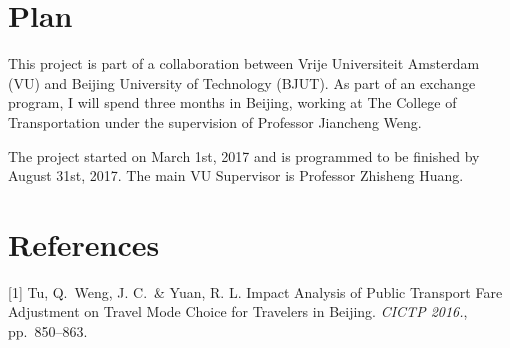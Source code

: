 \documentclass{article}
\begin{document}
\section{Plan}
This project is part of a collaboration between Vrije Universiteit Amsterdam (VU) and Beijing University of Technology (BJUT). As part of an exchange program, I will spend three months in Beijing, working at The College of Transportation under the supervision of Professor Jiancheng Weng. 

The project started on March 1st, 2017 and is programmed to be finished by August 31st, 2017. The main VU Supervisor is Professor Zhisheng Huang. 

\section*{References}

\small

[1] Tu, Q.\ Weng, J. C.\ \& Yuan, R. L. Impact Analysis of Public Transport Fare Adjustment on Travel Mode Choice for Travelers in Beijing. {\it CICTP 2016.}, pp.\ 850--863.
\end{document}

